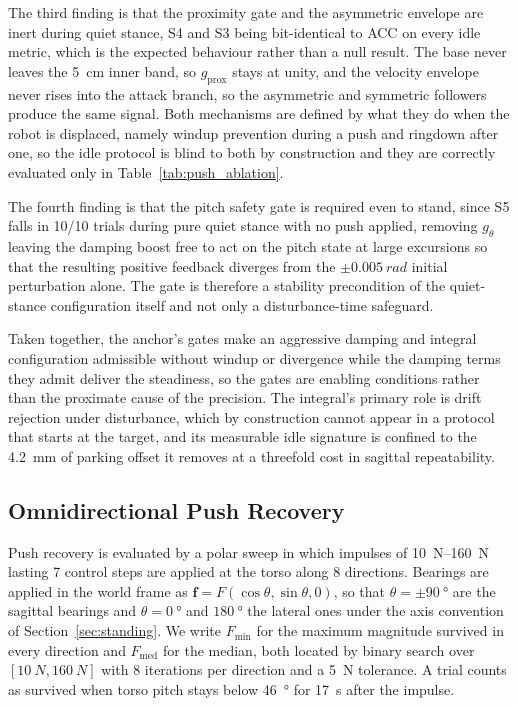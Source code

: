 \documentclass[a4paper,fleqn]{cas-dc}
\begin{document}
The third finding is that the proximity gate and the asymmetric envelope are
inert during quiet stance, S4 and S3 being bit-identical to ACC on every idle
metric, which is the expected behaviour rather than a null result. The base never
leaves the \SI{5}{cm} inner band, so $g_{\text{prox}}$ stays at unity, and the
velocity envelope never rises into the attack branch, so the asymmetric and
symmetric followers produce the same signal. Both mechanisms are defined by what
they do when the robot is displaced, namely windup prevention during a push and
ringdown after one, so the idle protocol is blind to both by construction and
they are correctly evaluated only in Table~\ref{tab:push_ablation}.

The fourth finding is that the pitch safety gate is required even to stand, since
S5 falls in \num{10}/\num{10} trials during pure quiet stance with no push
applied, removing $g_\theta$ leaving the damping boost free to act on the pitch
state at large excursions so that the resulting positive feedback diverges from
the ${\pm}\SI{0.005}{rad}$ initial perturbation alone. The gate is therefore a
stability precondition of the quiet-stance configuration itself and not only a
disturbance-time safeguard.

Taken together, the anchor's gates make an aggressive damping and integral
configuration admissible without windup or divergence while the damping terms
they admit deliver the steadiness, so the gates are enabling conditions rather
than the proximate cause of the precision. The integral's primary role is drift
rejection under disturbance, which by construction cannot appear in a protocol
that starts at the target, and its measurable idle signature is confined to the
\SI{4.2}{mm} of parking offset it removes at a threefold cost in sagittal
repeatability.

\subsection{Omnidirectional Push Recovery}
\label{sec:push}

Push recovery is evaluated by a polar sweep in which impulses of
\SIrange{10}{160}{N} lasting \num{7} control steps are applied at the torso along
\num{8} directions. Bearings are applied in the world frame as
$\mathbf{f}=F(\cos\theta,\sin\theta,0)$, so that $\theta{=}\pm\SI{90}{\degree}$
are the sagittal bearings and $\theta{=}\SI{0}{\degree}$ and
$\SI{180}{\degree}$ the lateral ones under the axis convention of
Section~\ref{sec:standing}. We write $F_{\min}$ for the maximum magnitude
survived in every direction and $F_{\text{med}}$ for the median, both located by
binary search over $[\SI{10}{N},\SI{160}{N}]$ with \num{8} iterations per
direction and a \SI{5}{N} tolerance. A trial counts as survived when torso pitch
stays below \SI{46}{\degree} for \SI{17}{s} after the impulse.
\end{document}

